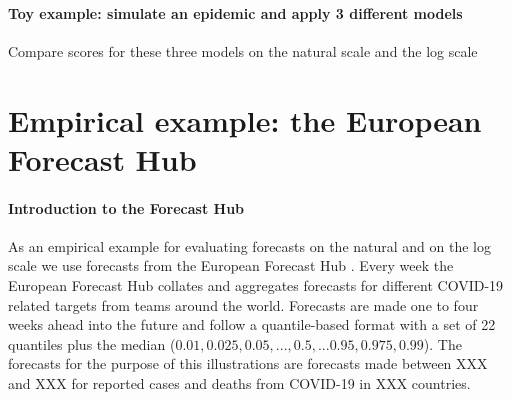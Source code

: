 \documentclass{article}
\begin{document}







\paragraph{Toy example: simulate an epidemic and apply 3 different models} Compare scores for these three models on the natural scale and the log scale


\section{Empirical example: the European Forecast Hub}

\paragraph{Introduction to the Forecast Hub} As an empirical example for evaluating forecasts on the natural and on the log scale we use forecasts from the European Forecast Hub \citep{europeancovid-19forecasthubEuropeanCovid19Forecast2021}. Every week the European Forecast Hub collates and aggregates forecasts for different COVID-19 related targets from teams around the world. Forecasts are made one to four weeks ahead into the future and follow a quantile-based format with a set of 22 quantiles plus the median ($0.01, 0.025, 0.05, ..., 0.5, ... 0.95, 0.975, 0.99$). The forecasts for the purpose of this illustrations are forecasts made between XXX and XXX for reported cases and deaths from COVID-19 in XXX countries. 
\end{document}
